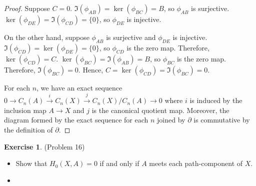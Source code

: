 \documentclass[12pt, psamsfonts]{amsart}
\theoremstyle{definition}
\newtheorem*{exer}{Exercise}
\theoremstyle{remark}
\numberwithin{equation}{section}
\begin{document}
\begin{proof}
  Suppose $C = 0$.
  $\Im(\phi_{AB}) = \ker(\phi_{BC}) = B$, so $\phi_{AB}$ is surjective.
  $\ker(\phi_{DE}) = \Im(\phi_{CD}) = \{ 0 \}$, so $\phi_{DE}$ is injective.

  On the other hand, suppose $\phi_{AB}$ is surjective and $\phi_{DE}$ is injective.
  $\Im(\phi_{CD}) = \ker(\phi_{DE}) = \{ 0 \}$, so $\phi_{CD}$ is the zero map.
  Therefore, $\ker(\phi_{CD}) = C$.
  $\ker(\phi_{BC}) = \Im(\phi_{AB}) = B$, so $\phi_{BC}$ is the zero map.
  Therefore, $\Im(\phi_{BC}) = 0$.
  Hence, $C = \ker(\phi_{CD}) = \Im(\phi_{BC}) = 0$.

  For each $n$, we have an exact sequence $0 \rightarrow C_n(A) \xrightarrow{i} C_n(X) \xrightarrow{j} C_n(X)/C_n(A) \rightarrow 0$ where $i$ is induced by the inclusion map $A \rightarrow X$ and $j$ is the canonical quotient map.
  Moreover, the diagram formed by the exact sequence for each $n$ joined by $\partial$ is commutative by the definition of $\partial$.
\end{proof}

\begin{exer}{(Problem 16)}
  \begin{itemize}
    \item
      Show that $H_0(X, A) = 0$ if and only if $A$ meets each path-component of $X$.
    \item
  \end{itemize}
\end{exer}
\end{document}
